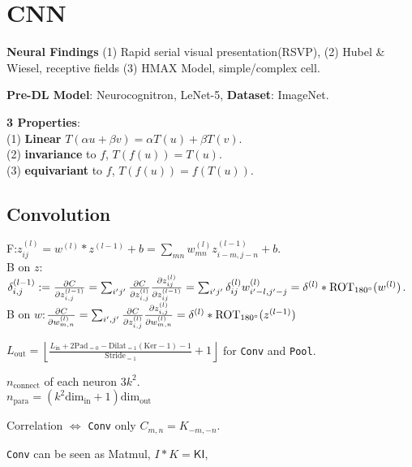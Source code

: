 \section{CNN}

\textbf{Neural Findings}
(1) Rapid serial visual presentation(RSVP), (2) Hubel \& Wiesel, receptive fields (3) HMAX Model, simple/complex cell.

\textbf{Pre-DL Model}: Neurocognitron, LeNet-5, \textbf{Dataset}: ImageNet.

\textbf{3 Properties}:\\
(1) \textbf{Linear} \(T(\alpha {u}+\beta {v})=\alpha T({u})+\beta T({v})\).\\ (2) \textbf{invariance} to \(f\), \(T(f({u}))=T({u})\).\\ (3) \textbf{equivariant} to \(f\), \(T(f({u}))=f(T({u}))\).

\subsection*{Convolution}
\textsf{F}:\( z_{ij}^{(l)}=w^{(l)} * z^{(l-1)}+b= \sum_{mn} w_{mn}^{(l)} z_{i-m, j-n}^{(l-1)}+b\). \\
\textsf{B} on \(z\):\(\delta_{i,j}^{(l-1)} := \pdv{C}{z^{(l-1)}_{i,j}} = \sum_{i'j'} \pdv{C}{z^{(l)}_{i,j}} \pdv{z^{(l)}_{ij}}{z^{(l-1)}_{ij}} =  \sum_{i'j'} \delta_{ij}^{(l)} w_{i'-l,j'-j}^{(l)} = \delta^{(l)} * \text{ROT}_{180^{\circ}}(w^{(l)})\).\\
\textsf{B} on \(w\):\(\pdv{C}{w^{(l)}_{m,n}} =  \sum_{i',j'} \pdv{C}{z^{(l)}_{i,j}} \pdv{z^{(l)}_{i,j}}{w^{(l)}_{m,n}} =  \delta^{(l)} * \text{ROT}_{180^{\circ}}(z^{(l-1)})\)

\( L_{\text{out}}=\left\lfloor \frac{  L_{\text{in}} + 2\text{Pad}_{=0} - \text {Dilat}_{=1}(\text{Ker} - 1)-1 }{\text {Stride}_{=1}} + 1 \right\rfloor \) for \verb|Conv| and \verb|Pool|.

\(n_{\text{connect}}\) of each neuron \(3k^2\).\\
\(n_{\text{para}} = ( k^2 \text{dim}_{\text{in}} + 1)\text{dim}_{\text{out}}\)

Correlation \(\Leftrightarrow\) \verb|Conv| only \(C_{m,n} = K_{-m,-n}\).

\verb|Conv| can be seen as Matmul, \(I * K = \mathsf{K I}\),

